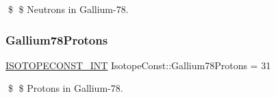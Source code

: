 \$ \$ Neutrons in Gallium-\/78. \mbox{\label{group___isotope_const-_gallium-_ga78_ga6361144357f601dcc11ebe86dadf613e}} 
\subsubsection{\texorpdfstring{Gallium78\+Protons}{Gallium78Protons}}
{\footnotesize\ttfamily \mbox{\hyperlink{group___isotope_const-_macros_ga5f18360b3e99483a35c32d789e62621c}{I\+S\+O\+T\+O\+P\+E\+C\+O\+N\+S\+T\+\_\+\+I\+NT}} Isotope\+Const\+::\+Gallium78\+Protons = 31}

\$ \$ Protons in Gallium-\/78. 